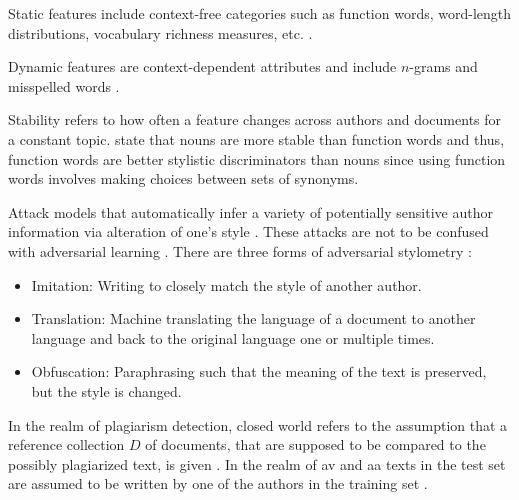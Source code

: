 \begin{definition}
    Static features include context-free categories such as function words, 
    word-length distributions, vocabulary richness measures, etc. \cite{abbasi_writeprints_2008}.
\end{definition}

\begin{definition}
    Dynamic features are context-dependent attributes and include $n$-grams and misspelled words \cite{abbasi_writeprints_2008}.
\end{definition}

\begin{definition}
    [Stability]
    Stability refers to how often a feature changes across authors and documents for a constant topic.
    \citet{abbasi_writeprints_2008} state that nouns are more stable than function words and thus, 
    function words are better stylistic discriminators than nouns 
    since using function words involves making choices between sets of synonyms.
\end{definition}

\begin{definition}
    Attack models that automatically infer a variety of potentially sensitive author information \cite{emmery_adversarial_2021} 
    via alteration of one's style \cite{neal_surveying_2018}.
    These attacks are not to be confused with adversarial learning \cite{emmery_adversarial_2021}.
    There are three forms of adversarial stylometry \cite{neal_surveying_2018}:
    \begin{itemize}
        \item Imitation: Writing to closely match the style of another author.
        \item Translation: Machine translating the language of a document to another language and back to the original language one or multiple times.
        \item Obfuscation: Paraphrasing such that the meaning of the text is preserved, but the style is changed.
    \end{itemize}
\end{definition}

\begin{definition}
    In the realm of plagiarism detection, closed world refers to the assumption 
    that a reference collection $D$ of documents, 
    that are supposed to be compared to the possibly plagiarized text, is given \cite{stein_intrinsic_2011}.
    In the realm of \ac{av} and \ac{aa} texts in the test set are assumed to be written by one of the authors in the training set \cite{boenninghoff_o2d2_2021,neal_surveying_2018}.
\end{definition}

